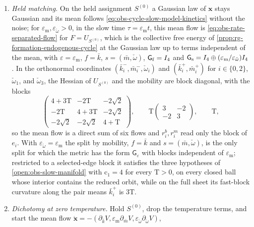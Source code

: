 \begin{enumerate}
\item[(i)] \emph{Held matching.} On the held assignment $S^{(0)}$ a Gaussian law
of $\mathbf x$ stays Gaussian and its mean follows
\eqref{eq:obs-cycle-slow-model-kinetics} without the noise; for
$\varepsilon_{\mathrm m},\varepsilon_{\check\omega}>0$, in the slow time
$\tau=\varepsilon_{\mathrm m}t$, this mean flow is \eqref{eq:obs-rate-separated-flow}
for $F=U_{S^{(0)}}$, which is the collective free energy of
\cref{prop:rg-formation-endogenous-cycle} at the Gaussian law up to terms
independent of the mean, with $\varepsilon=\varepsilon_{\mathrm m}$, $f=\bar k$,
$s=(\bar m,\check\omega)$, $\mathsf G_{\rm f}=I_4$ and
$\mathsf G_{\rm s}=I_4\oplus(\varepsilon_{\mathrm m}/\varepsilon_{\check\omega})I_4$. In the
orthonormal coordinates $(\bar k^-_i,\bar m^-_i,\check\omega_i)$ and
$(\bar k^+_i,\bar m^+_i)$ for $i\in\{0,2\}$, $\check\omega_1$, and $\check\omega_3$, the Hessian
of $U_{S^{(0)}}$ and the mobility are block diagonal, with the blocks
\begin{equation}
\begin{pmatrix}4+3\mathrm T&-2\mathrm T&-2\sqrt2\\-2\mathrm T&4+3\mathrm T&-2\sqrt2\\
-2\sqrt2&-2\sqrt2&4+\mathrm T\end{pmatrix},\qquad
\mathrm T\begin{pmatrix}3&-2\\-2&3\end{pmatrix},\qquad\mathrm T,
\label{eq:obs-cycle-held-blocks}
\end{equation}
so the mean flow is a direct sum of six flows and $r^b_i,r^m_i$ read only the block
of $e_i$. With $\varepsilon_{\check\omega}=\varepsilon_{\mathrm m}$ the split by mobility,
$f=\bar k$ and $s=(\bar m,\check\omega)$, is the only split for which the metric has the
form $\mathsf G_\varepsilon$ with blocks independent of $\varepsilon_{\mathrm m}$;
restricted to a selected-edge block it satisfies the three hypotheses of
\cref{open:obs-slow-manifold} with $\mathrm c_1=4$ for every $\mathrm T>0$, on every
closed ball whose interior contains the reduced orbit, while on the full sheet its
fast-block curvature along the pair means $\bar k^+_i$ is $3\mathrm T$.
\item[(ii)] \emph{Dichotomy at zero temperature.} Hold $S^{(0)}$, drop the
temperature terms, and start the mean flow
$\dot{\mathbf x}=-(\partial_{\bar k}V,\varepsilon_{\mathrm m}\partial_{\bar m}V,\varepsilon_{\check\omega}\partial_{\check\omega} V)$,

\end{enumerate}
